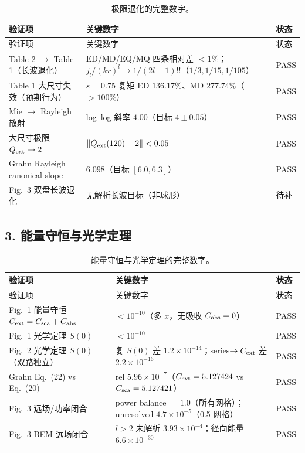 \begin{longtable}{p{4.6cm}p{5.4cm}p{3.2cm}}
\caption{极限退化的完整数字。}\label{tab:limit}\\
\toprule
验证项 & 关键数字 & 状态 \\
\midrule
\endfirsthead
\toprule
验证项 & 关键数字 & 状态 \\
\midrule
\endhead
Table 2 $\to$ Table 1（长波退化） & ED/MD/EQ/MQ 四条相对差 $<1\%$；$j_l/(kr)^l\to1/(2l+1)!!$（$1/3,1/15,1/105$） & PASS \\
Table 1 大尺寸失效（预期行为） & $s=0.75$ 复矩 ED $136.17\%$、MD $277.74\%$（$>100\%$） & PASS \\
Mie $\to$ Rayleigh 散射 & log--log 斜率 $4.00$（目标 $4\pm0.05$） & PASS \\
大尺寸极限 $Q_{\rm ext}\to2$ & $\|Q_{\rm ext}(120)-2\|<0.05$ & PASS \\
Grahn Rayleigh canonical slope & $6.098$（目标 $[6.0,6.3]$） & PASS \\
Fig.~3 双盘长波退化 & 无解析长波目标（非球形） & 待补 \\
\bottomrule
\end{longtable}

\subsection{3. 能量守恒与光学定理}

\begin{longtable}{p{4.6cm}p{5.4cm}p{3.2cm}}
\caption{能量守恒与光学定理的完整数字。}\label{tab:energy}\\
\toprule
验证项 & 关键数字 & 状态 \\
\midrule
\endfirsthead
\toprule
验证项 & 关键数字 & 状态 \\
\midrule
\endhead
Fig.~1 能量守恒 $C_{\rm ext}=C_{\rm sca}+C_{\rm abs}$ & $<10^{-10}$（多 $x$，无吸收 $C_{\rm abs}=0$） & PASS \\
Fig.~1 光学定理 $S(0)$ & $<10^{-10}$ & PASS \\
Fig.~2 光学定理 $S(0)$（双路独立） & 复 $S(0)$ 差 $1.2\times10^{-14}$；series$\to C_{\rm ext}$ 差 $2.2\times10^{-16}$ & PASS \\
Grahn Eq.~(22) vs Eq.~(20) & rel $5.96\times10^{-7}$（$C_{\rm ext}=5.127424$ vs $C_{\rm sca}=5.127421$） & PASS \\
Fig.~3 远场/功率闭合 & power balance $=1.0$（所有网格）；unresolved $4.7\times10^{-5}$（0.5 网格） & PASS \\
Fig.~3 BEM 远场闭合 & $l>2$ 未解析 $3.93\times10^{-4}$；径向能量 $6.6\times10^{-30}$ & PASS \\
\bottomrule
\end{longtable}

